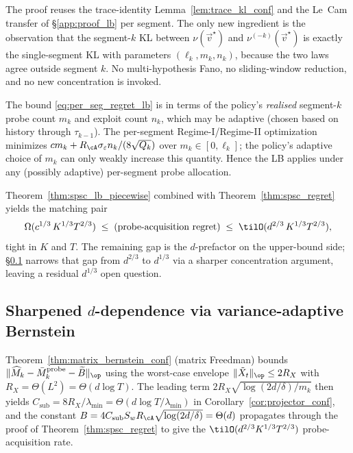 \begin{remark}
\label{rem:lb_piecewise_tools}
The proof reuses the trace-identity Lemma~\ref{lem:trace_kl_conf} and
the Le~Cam transfer of \S\ref{app:proof_lb} per segment. The only new
ingredient is the observation that the segment-$k$ KL between
$\nu(\vec v^\star)$ and $\nu^{(-k)}(\vec v^\star)$ is exactly the
single-segment KL with parameters $(\ell_k, m_k, n_k)$, because the
two laws agree outside segment $k$. No multi-hypothesis Fano, no
sliding-window reduction, and no new concentration is invoked.
\end{remark}

\begin{remark}
\label{rem:lb_piecewise_adaptive}
The bound \eqref{eq:per_seg_regret_lb} is in terms of the policy's
\emph{realised} segment-$k$ probe count $m_k$ and exploit count $n_k$,
which may be adaptive (chosen based on history through $\tau_{k-1}$).
The per-segment Regime-I/Regime-II optimization minimizes
$cm_k+R_\cA\sigma_\varepsilon n_k/(8\sqrt{Q_k})$ over $m_k\in[0,\ell_k]$;
the policy's adaptive choice of $m_k$ can only weakly increase this
quantity. Hence the LB applies under any (possibly adaptive)
per-segment probe allocation.
\end{remark}

\begin{remark}
\label{rem:combined_lb_ub}
Theorem~\ref{thm:spsc_lb_piecewise} combined with
Theorem~\ref{thm:spsc_regret} yields the matching pair
\[
\Omega(c^{1/3}\,K^{1/3}T^{2/3})
\;\le\;\text{(probe-acquisition regret)}\;\le\;
\tilO(d^{2/3}\,K^{1/3}T^{2/3}),
\]
tight in $K$ and $T$. The remaining gap is the $d$-prefactor on the
upper-bound side; \S\ref{app:ext_sharpened_d} narrows that gap from
$d^{2/3}$ to $d^{1/3}$ via a sharper concentration argument, leaving
a residual $d^{1/3}$ open question.
\end{remark}

\subsection{Sharpened \texorpdfstring{$d$}{d}-dependence via variance-adaptive Bernstein}
\label{app:ext_sharpened_d}

Theorem~\ref{thm:matrix_bernstein_conf} (matrix Freedman) bounds
$\|\widehat M_k-\bar M_k^{\mathrm{probe}}-\widetilde B\|_\op$ using the
worst-case envelope $\|\tilde X_t\|_\op\le 2R_X$ with
$R_X=\Theta(L^2)=\Theta(d\log T)$. The leading term
$2R_X\sqrt{\log(2d/\delta)/m_k}$ then yields
$C_{\mathrm{sub}}=8R_X/\lambda_{\min}=\Theta(d\log T/\lambda_{\min})$
in Corollary~\ref{cor:projector_conf}, and the constant
$B = 4 C_{\mathrm{sub}} S_w R_\cA\sqrt{\log(2d/\delta)} = \Theta(d)$
propagates through the proof of Theorem~\ref{thm:spsc_regret} to give
the $\tilO(d^{2/3}K^{1/3}T^{2/3})$ probe-acquisition rate.

